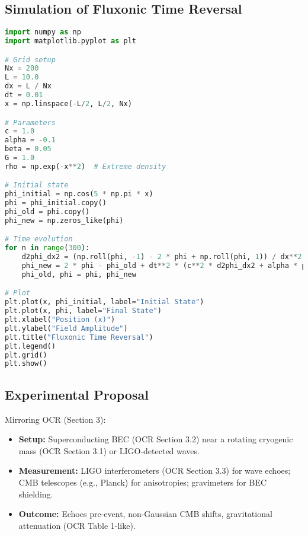 \documentclass{article}
\begin{document}
\subsection{Simulation of Fluxonic Time Reversal}
\begin{lstlisting}[language=Python, caption=Fluxonic Time Reversal Simulation, label=lst:timereversal]
import numpy as np
import matplotlib.pyplot as plt

# Grid setup
Nx = 200
L = 10.0
dx = L / Nx
dt = 0.01
x = np.linspace(-L/2, L/2, Nx)

# Parameters
c = 1.0
alpha = -0.1
beta = 0.05
G = 1.0
rho = np.exp(-x**2)  # Extreme density

# Initial state
phi_initial = np.cos(5 * np.pi * x)
phi = phi_initial.copy()
phi_old = phi.copy()
phi_new = np.zeros_like(phi)

# Time evolution
for n in range(300):
    d2phi_dx2 = (np.roll(phi, -1) - 2 * phi + np.roll(phi, 1)) / dx**2  # Periodic boundaries
    phi_new = 2 * phi - phi_old + dt**2 * (c**2 * d2phi_dx2 + alpha * phi + beta * phi**3 + 8 * np.pi * G * rho)
    phi_old, phi = phi, phi_new

# Plot
plt.plot(x, phi_initial, label="Initial State")
plt.plot(x, phi, label="Final State")
plt.xlabel("Position (x)")
plt.ylabel("Field Amplitude")
plt.title("Fluxonic Time Reversal")
plt.legend()
plt.grid()
plt.show()
\end{lstlisting}

\subsection{Experimental Proposal}
Mirroring OCR (Section 3):
\begin{itemize}
    \item \textbf{Setup:} Superconducting BEC (OCR Section 3.2) near a rotating cryogenic mass (OCR Section 3.1) or LIGO-detected waves.
    \item \textbf{Measurement:} LIGO interferometers (OCR Section 3.3) for wave echoes; CMB telescopes (e.g., Planck) for anisotropies; gravimeters for BEC shielding.
    \item \textbf{Outcome:} Echoes pre-event, non-Gaussian CMB shifts, gravitational attenuation (OCR Table 1-like).
\end{itemize}
\end{document}
